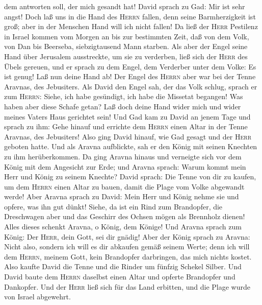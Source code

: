 dem antworten soll, der mich gesandt hat!  David sprach
zu Gad: Mir ist sehr angst! Doch laß uns in die Hand des \textsc{Herrn}
fallen, denn seine Barmherzigkeit ist groß; aber in der Menschen Hand
will ich nicht fallen!  Da ließ der \textsc{Herr}
Pestilenz in Israel kommen vom Morgen an bis zur bestimmten Zeit, daß
von dem Volk, von Dan bis Beerseba, siebzigtausend Mann starben.
 Als aber der Engel seine Hand über Jerusalem
ausstreckte, um sie zu verderben, ließ sich der \textsc{Herr} des Übels
gereuen, und er sprach zu dem Engel, dem Verderber unter dem Volke: Es
ist genug! Laß nun deine Hand ab! Der Engel des \textsc{Herrn} aber war
bei der Tenne Aravnas, des Jebusiters.  Als David den
Engel sah, der das Volk schlug, sprach er zum \textsc{Herrn}: Siehe, ich
habe gesündigt, ich habe die Missetat begangen! Was haben aber diese
Schafe getan? Laß doch deine Hand wider mich und wider meines Vaters
Haus gerichtet sein!  Und Gad kam zu David an jenem Tage
und sprach zu ihm: Gehe hinauf und errichte dem \textsc{Herrn} einen
Altar in der Tenne Aravnas, des Jebusiters!  Also ging
David hinauf, wie Gad gesagt und der \textsc{Herr} geboten hatte.
 Und als Aravna aufblickte, sah er den König mit seinen
Knechten zu ihm herüberkommen. Da ging Aravna hinaus und verneigte sich
vor dem König mit dem Angesicht zur Erde;  und Aravna
sprach: Warum kommt mein Herr und König zu seinem Knechte? David sprach:
Die Tenne von dir zu kaufen, um dem \textsc{Herrn} einen Altar zu bauen,
damit die Plage vom Volke abgewandt werde!  Aber Aravna
sprach zu David: Mein Herr und König nehme sie und opfere, was ihn gut
dünkt! Siehe, da ist ein Rind zum Brandopfer, die Dreschwagen aber und
das Geschirr des Ochsen mögen als Brennholz dienen! 
Alles dieses schenkt Aravna, o König, dem Könige! Und Aravna sprach zum
König: Der \textsc{Herr}, dein Gott, sei dir gnädig! 
Aber der König sprach zu Aravna: Nicht also, sondern ich will es dir
abkaufen gemäß seinem Werte; denn ich will dem \textsc{Herrn}, meinem
Gott, kein Brandopfer darbringen, das mich nichts kostet. Also kaufte
David die Tenne und die Rinder um fünfzig Schekel Silber.
 Und David baute dem \textsc{Herrn} daselbst einen Altar
und opferte Brandopfer und Dankopfer. Und der \textsc{Herr} ließ sich
für das Land erbitten, und die Plage wurde von Israel abgewehrt.
